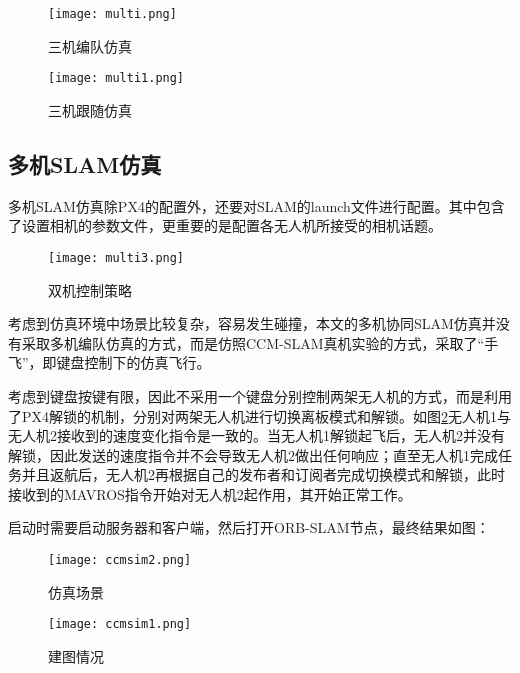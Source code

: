 \begin{figure}[htbp]
	\centering
	\begin{minipage}[t]{0.45\columnwidth} %
		\centering
		\texttt{[image: multi.png]}
		\caption{三机编队仿真}
		\label{fig4-8}
	\end{minipage}
	\begin{minipage}[t]{0.45\columnwidth}
		\centering
		\texttt{[image: multi1.png]}
		\caption{三机跟随仿真}
		\label{fig4-8-1}
	\end{minipage}
\end{figure}


\subsection{多机SLAM仿真} \label{4.3.3}

多机SLAM仿真除PX4的配置外，还要对SLAM的launch文件进行配置。其中包含了设置相机的参数文件，更重要的是配置各无人机所接受的相机话题。

\begin{figure}[!ht]
	\centering
	\texttt{[image: multi3.png]}
	\caption{双机控制策略}
	\label{fig-multicontrol}
\end{figure}

考虑到仿真环境中场景比较复杂，容易发生碰撞，本文的多机协同SLAM仿真并没有采取多机编队仿真的方式，而是仿照CCM-SLAM真机实验的方式，采取了“手飞”，即键盘控制下的仿真飞行。

考虑到键盘按键有限，因此不采用一个键盘分别控制两架无人机的方式，而是利用了PX4解锁的机制，分别对两架无人机进行切换离板模式和解锁。如图\ref{fig-multicontrol}无人机1与无人机2接收到的速度变化指令是一致的。当无人机1解锁起飞后，无人机2并没有解锁，因此发送的速度指令并不会导致无人机2做出任何响应；直至无人机1完成任务并且返航后，无人机2再根据自己的发布者和订阅者完成切换模式和解锁，此时接收到的MAVROS指令开始对无人机2起作用，其开始正常工作。

启动时需要启动服务器和客户端，然后打开ORB-SLAM节点，最终结果如图：

\begin{figure}[htbp]
	\centering
	\begin{minipage}[t]{0.45\columnwidth} %
		\centering
		\texttt{[image: ccmsim2.png]}
		\caption{仿真场景}
		\label{fig4-9}
	\end{minipage}
	\begin{minipage}[t]{0.45\columnwidth}
		\centering
		\texttt{[image: ccmsim1.png]}
		\caption{建图情况}
		\label{fig4-9-1}
	\end{minipage}
\end{figure}

